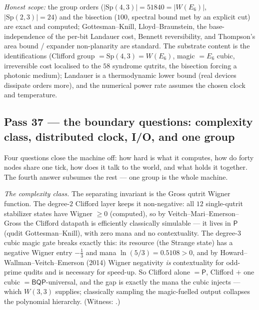 \documentclass[11pt]{article}
\begin{document}
\emph{Honest scope:} the group orders ($|\mathrm{Sp}(4,3)|=51840=|W(E_6)|$, $|\mathrm{Sp}(2,3)|=24$)
and the bisection ($100$, spectral bound met by an explicit cut) are exact and computed;
Gottesman--Knill, Lloyd--Braunstein, the base-independence of the per-bit Landauer cost, Bennett
reversibility, and Thompson's area bound / expander non-planarity are standard. The substrate content
is the identifications (Clifford group $=\mathrm{Sp}(4,3)=W(E_6)$, magic $=E_6$ cubic, irreversible
cost localised to the $58$ syndrome qutrits, the bisection forcing a photonic medium); Landauer is a
thermodynamic lower bound (real devices dissipate orders more), and the numerical power rate assumes
the chosen clock and temperature.

\subsection{Pass 37 --- the boundary questions: complexity class, distributed clock, I/O, and one group}
\label{sec:capstone-thirtyseven}

Four questions close the machine off: how hard is what it computes, how do forty nodes share one
tick, how does it talk to the world, and what holds it together. The fourth answer subsumes the rest
--- one group is the whole machine.

\emph{The complexity class.} The separating invariant is the Gross qutrit Wigner function. The
degree-$2$ Clifford layer keeps it non-negative: all $12$ single-qutrit stabilizer states have Wigner
$\ge0$ (computed), so by Veitch--Mari--Emerson--Gross the Clifford datapath is efficiently classically
simulable --- it lives in $\mathsf{P}$ (qudit Gottesman--Knill), with zero mana and no contextuality.
The degree-$3$ cubic magic gate breaks exactly this: its resource (the Strange state) has a negative
Wigner entry $-\tfrac13$ and mana $\ln(5/3)=0.5108>0$, and by Howard--Wallman--Veitch--Emerson (2014)
Wigner negativity \emph{is} contextuality for odd-prime qudits and is necessary for speed-up. So
Clifford alone $=\mathsf{P}$, Clifford $+$ one cubic $=\mathsf{BQP}$-universal, and the gap is exactly
the mana the cubic injects --- which $W(3,3)$ supplies; classically sampling the magic-fuelled output
collapses the polynomial hierarchy. (Witness: .)
\end{document}

